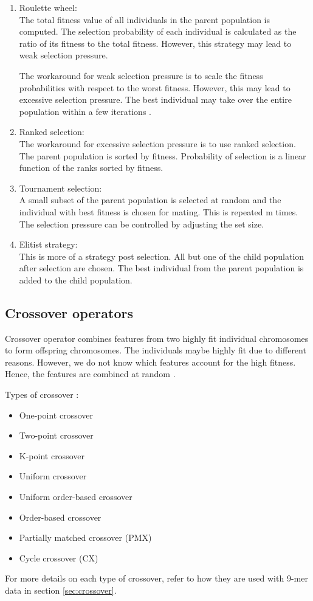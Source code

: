 \documentclass[12pt,a4paper]{article}
\begin{document}
	\begin{enumerate}
	\item Roulette wheel:\\
	The total fitness value of all individuals in the parent population is computed. The selection probability of each individual is calculated as the ratio of its fitness to the total fitness. However, this strategy may lead to weak selection pressure. \par
	The workaround for weak selection pressure is to scale the fitness probabilities with respect to the worst fitness. However, this may lead to excessive selection pressure. The best individual may take over the entire population within a few iterations \cite{handbook}. \par
	
	\item Ranked selection:\\
	The workaround for excessive selection pressure is to use ranked selection. The parent population is sorted by fitness. Probability of selection is a linear function of the ranks sorted by fitness.
	
	\item Tournament selection:\\
	A small subset of the parent population is selected at random and the individual with best fitness is chosen for mating. This is repeated m times. The selection pressure can be controlled by adjusting the set size.
	
	\item Elitist strategy: \\
	This is more of a strategy post selection. All but one of the child population after selection are chosen. The best individual from the parent population is added to the child population.
	\end{enumerate}

	\subsection{Crossover operators}
	Crossover operator combines features from two highly fit individual chromosomes to form offspring chromosomes. The individuals maybe highly fit due to different reasons. However, we do not know which features account for the high fitness. Hence, the features are combined at random \cite{goldberg}.  \par
	Types of crossover \cite{goldberg}:
	\begin{itemize}
	\item One-point crossover
	\item Two-point crossover
	\item K-point crossover
	\item Uniform crossover
	\item Uniform order-based crossover
	\item Order-based crossover
	\item Partially matched crossover (PMX)
	\item Cycle crossover (CX)
	\end{itemize}
	For more details on each type of crossover, refer to how they are used with 9-mer data in section \ref{sec:crossover}.
\end{document}
